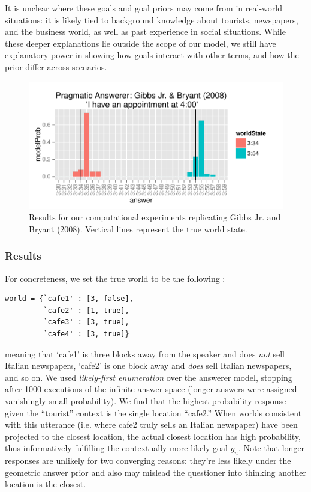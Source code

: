 \documentclass[12pt, floatsintext, jou]{apa6}
\begin{document}
It is unclear where these goals and goal priors may come from in real-world situations: it is likely tied to background knowledge about tourists, newspapers, and the business world, as well as past experience in social situations. While these deeper explanations lie outside the scope of our model, we still have explanatory power in showing how goals interact with other terms, and how the prior differ across scenarios. 

 \begin{figure}[t!]
\begin{center}
\includegraphics[scale = 1]{timeExpResults.pdf}
\end{center}
\vspace{-.25cm}
\caption{Results for our computational experiments replicating Gibbs Jr. and Bryant (2008). Vertical lines represent the true world state.}
\label{fig:timeExperimentResults}
\end{figure}

\subsubsection{Results}

For concreteness, we set the true world to be the following :

\begin{lstlisting}
world = {`cafe1' : [3, false],
         `cafe2' : [1, true],
         `cafe3' : [3, true],
         `cafe4' : [3, true]}
\end{lstlisting}
meaning that `cafe1' is three blocks away from the speaker and does \emph{not} sell Italian newspapers, `cafe2' is one block away and \emph{does} sell Italian newspapers, and so on. We used \emph{likely-first enumeration} over the answerer model, stopping after 1000 executions of the infinite answer space (longer answers were assigned vanishingly small probability). We find that the highest probability response given the ``tourist'' context is the single location ``cafe2.'' When worlds consistent with this utterance (i.e. where cafe2 truly sells an Italian newspaper) have been projected to the closest location, the actual closest location has high probability, thus informatively fulfilling the contextually more likely goal $g_n$. Note that longer responses are unlikely for two converging reasons: they're less likely under the geometric answer prior and also may mislead the questioner into thinking another location is the closest. 
\end{document}
